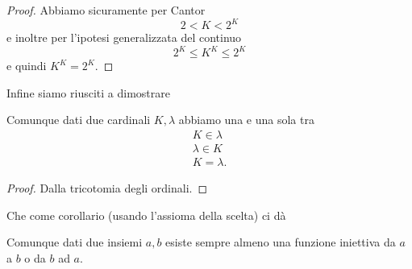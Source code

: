 \documentclass[11pt]{scrartcl}
\begin{document}
 	\begin{proof}
 		Abbiamo sicuramente per Cantor
 		$$2<K<2^K$$
 		e inoltre per l'ipotesi generalizzata del continuo
 		$$2^K\le K^K\le 2^K$$
 		e quindi $K^K=2^K$.
 	\end{proof}
 	Infine siamo riusciti a dimostrare
 	\begin{theorem}
 		Comunque dati due cardinali $K,\lambda$ abbiamo una e una sola tra
 		\begin{gather*}
 			K\in \lambda \\
 			\lambda\in K \\
 			K=\lambda.
 		\end{gather*}
 	\end{theorem}
 	\begin{proof}
 		Dalla tricotomia degli ordinali.
 	\end{proof}
 	Che come corollario (usando l'assioma della scelta) ci dà
 	\begin{corollary}
 		Comunque dati due insiemi $a,b$ esiste sempre almeno una funzione iniettiva da $a$ a $b$ o da $b$ ad $a$.
 	\end{corollary}
 	
\end{document}
